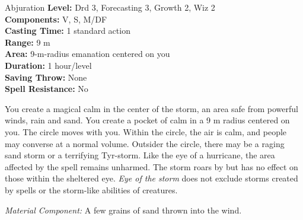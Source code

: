 {Abjuration}
{
    \textbf{Level:}
    Drd 3, Forecasting 3, Growth 2, Wiz 2\\
    \textbf{Components:}
    V, S, M/DF\\
    \textbf{Casting Time:}
    1 standard action\\
    \textbf{Range:}
    9 m\\
    \textbf{Area:}
    9-m-radius emanation centered on you\\
    \textbf{Duration:}
    1 hour/level\\
    \textbf{Saving Throw:}
    None\\
    \textbf{Spell Resistance:}
    No\\
}
{
    You create a magical calm in the center of the storm, an area safe from powerful winds, rain and sand. You create a pocket of calm in a 9 m radius centered on you. The circle moves with you. Within the circle, the air is calm, and people may converse at a normal volume. Outsider the circle, there may be a raging sand storm or a terrifying Tyr-storm. Like the eye of a hurricane, the area affected by the spell remains unharmed. The storm roars by but has no effect on those within the sheltered eye. \emph{Eye of the storm} does not exclude storms created by spells or the storm-like abilities of creatures.

    \textit{Material Component:} A few grains of sand thrown into the wind.
}
